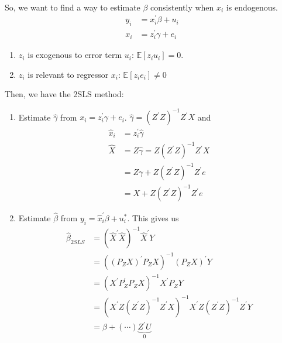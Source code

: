 \begin{eg}
    \

    So, we want to find a way to estimate $\beta$ consistently when $x_i$ is endogenous.
    \begin{align*}
        y_i &= x_i^{\prime} \beta + u_i \\
        x_i &= z_i^{\prime} \gamma + e_i
    \end{align*}

    \begin{enumerate}
        \item $z_i$ is exogenous to error term $u_i$: $\mathbb{E}[z_i u_i] = 0$.
        \item $z_i$ is relevant to regressor $x_i$: $\mathbb{E}[z_i e_i] \neq 0$
    \end{enumerate}

    Then, we have the 2SLS method:
    \begin{enumerate}
        \item Estimate $\hat{\gamma}$ from $x_i = z_i^{\prime} \gamma + e_i$. $\hat{\gamma} = (Z^{\prime} Z)^{-1}Z^{\prime} X$ and 
            \begin{align*}
                \hat{x}_i &= z_i^{\prime} \hat{\gamma} \\
                \hat{X} &= Z \hat{\gamma} = Z(Z^{\prime} Z)^{-1}Z^{\prime} X \\
                &= Z \gamma + Z(Z^{\prime} Z)^{-1}Z^{\prime} e \\
                &= X + Z(Z^{\prime} Z)^{-1}Z^{\prime} e
            \end{align*}
        \item Estimate $\hat{\beta}$ from $y_i = \hat{x}_i^{\prime} \beta + u_i^*$. This gives us 
            \begin{align*}
                \hat{\beta}_{2SLS} &= \left( \hat{X}^{\prime} \hat{X} \right)^{-1} \hat{X}^{\prime} Y \\
                &= \left((P_Z X)^{\prime} P_Z X\right)^{-1} (P_Z X)^{\prime} Y \\
                &= \left(X^{\prime} P_Z^{\prime} P_Z X\right)^{-1} X^{\prime} P_Z Y \\
                &= \left(X^{\prime} Z(Z^{\prime} Z)^{-1} Z^{\prime} X\right)^{-1} X^{\prime} Z (Z^{\prime} Z)^{-1} Z^{\prime} Y \\
                &= \beta + (\cdots) \underset{0}{\underbrace{Z^{\prime} U}}
            \end{align*}


\end{enumerate}
\end{eg}
